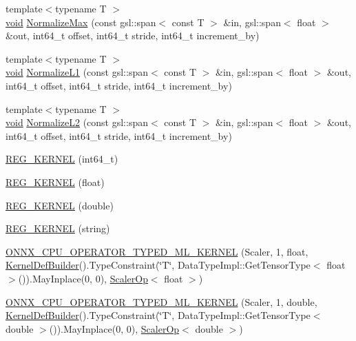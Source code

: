 \begin{DoxyCompactItemize}
\item 
{\footnotesize template$<$typename T $>$ }\\\mbox{\hyperlink{mlasi_8h_a88f941d423cb2a819b70a1358982b1a6}{void}} \mbox{\hyperlink{namespaceonnxruntime_1_1ml_a139f0b2858ef69c7f042de7e40c3d68e}{Normalize\+Max}} (const gsl\+::span$<$ const T $>$ \&in, gsl\+::span$<$ float $>$ \&out, int64\+\_\+t offset, int64\+\_\+t stride, int64\+\_\+t increment\+\_\+by)
\item 
{\footnotesize template$<$typename T $>$ }\\\mbox{\hyperlink{mlasi_8h_a88f941d423cb2a819b70a1358982b1a6}{void}} \mbox{\hyperlink{namespaceonnxruntime_1_1ml_a728024f4161db1cc2bb78c176c44a30b}{Normalize\+L1}} (const gsl\+::span$<$ const T $>$ \&in, gsl\+::span$<$ float $>$ \&out, int64\+\_\+t offset, int64\+\_\+t stride, int64\+\_\+t increment\+\_\+by)
\item 
{\footnotesize template$<$typename T $>$ }\\\mbox{\hyperlink{mlasi_8h_a88f941d423cb2a819b70a1358982b1a6}{void}} \mbox{\hyperlink{namespaceonnxruntime_1_1ml_ac76638f7a14b53fec05c3a89531dff63}{Normalize\+L2}} (const gsl\+::span$<$ const T $>$ \&in, gsl\+::span$<$ float $>$ \&out, int64\+\_\+t offset, int64\+\_\+t stride, int64\+\_\+t increment\+\_\+by)
\item 
\mbox{\hyperlink{namespaceonnxruntime_1_1ml_a8bdddad1f74d9636ae31bf45b1ab989f}{R\+E\+G\+\_\+\+K\+E\+R\+N\+EL}} (int64\+\_\+t)
\item 
\mbox{\hyperlink{namespaceonnxruntime_1_1ml_ab2a505a119f840f07c34f61df83f8276}{R\+E\+G\+\_\+\+K\+E\+R\+N\+EL}} (float)
\item 
\mbox{\hyperlink{namespaceonnxruntime_1_1ml_ad94daf9a133880b481b9dcbcd3d51455}{R\+E\+G\+\_\+\+K\+E\+R\+N\+EL}} (double)
\item 
\mbox{\hyperlink{namespaceonnxruntime_1_1ml_ae58ff8c4bc5ac2f0851ae4c9fcfc21ae}{R\+E\+G\+\_\+\+K\+E\+R\+N\+EL}} (string)
\item 
\mbox{\hyperlink{namespaceonnxruntime_1_1ml_ab19bb6f13536cba8c5f56d20fed20d8d}{O\+N\+N\+X\+\_\+\+C\+P\+U\+\_\+\+O\+P\+E\+R\+A\+T\+O\+R\+\_\+\+T\+Y\+P\+E\+D\+\_\+\+M\+L\+\_\+\+K\+E\+R\+N\+EL}} (Scaler, 1, float, \mbox{\hyperlink{classonnxruntime_1_1KernelDefBuilder}{Kernel\+Def\+Builder}}().Type\+Constraint(\char`\"{}T\char`\"{}, Data\+Type\+Impl\+::\+Get\+Tensor\+Type$<$ float $>$()).May\+Inplace(0, 0), \mbox{\hyperlink{classonnxruntime_1_1ml_1_1ScalerOp}{Scaler\+Op}}$<$ float $>$)
\item 
\mbox{\hyperlink{namespaceonnxruntime_1_1ml_af22c68bb1af2f9cd1e8001474a54e67d}{O\+N\+N\+X\+\_\+\+C\+P\+U\+\_\+\+O\+P\+E\+R\+A\+T\+O\+R\+\_\+\+T\+Y\+P\+E\+D\+\_\+\+M\+L\+\_\+\+K\+E\+R\+N\+EL}} (Scaler, 1, double, \mbox{\hyperlink{classonnxruntime_1_1KernelDefBuilder}{Kernel\+Def\+Builder}}().Type\+Constraint(\char`\"{}T\char`\"{}, Data\+Type\+Impl\+::\+Get\+Tensor\+Type$<$ double $>$()).May\+Inplace(0, 0), \mbox{\hyperlink{classonnxruntime_1_1ml_1_1ScalerOp}{Scaler\+Op}}$<$ double $>$)

\end{DoxyCompactItemize}
